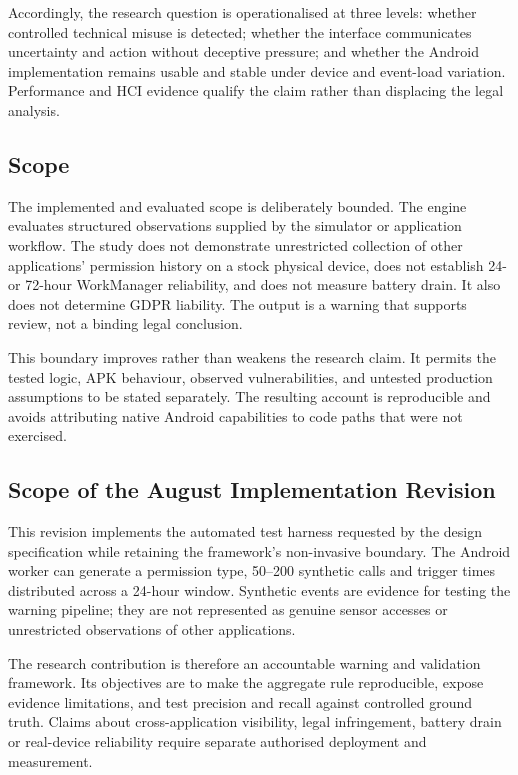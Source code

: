 Accordingly, the research question is operationalised at three levels: whether controlled technical misuse is detected; whether the interface communicates uncertainty and action without deceptive pressure; and whether the Android implementation remains usable and stable under device and event-load variation. Performance and HCI evidence qualify the claim rather than displacing the legal analysis.

\subsection{Scope}

The implemented and evaluated scope is deliberately bounded. The engine evaluates structured observations supplied by the simulator or application workflow. The study does not demonstrate unrestricted collection of other applications' permission history on a stock physical device, does not establish 24- or 72-hour WorkManager reliability, and does not measure battery drain. It also does not determine GDPR liability. The output is a warning that supports review, not a binding legal conclusion.

This boundary improves rather than weakens the research claim. It permits the tested logic, APK behaviour, observed vulnerabilities, and untested production assumptions to be stated separately. The resulting account is reproducible and avoids attributing native Android capabilities to code paths that were not exercised.

\subsection{Scope of the August Implementation Revision}

This revision implements the automated test harness requested by the design specification while retaining the framework's non-invasive boundary. The Android worker can generate a permission type, 50--200 synthetic calls and trigger times distributed across a 24-hour window. Synthetic events are evidence for testing the warning pipeline; they are not represented as genuine sensor accesses or unrestricted observations of other applications.

The research contribution is therefore an accountable warning and validation framework. Its objectives are to make the aggregate rule reproducible, expose evidence limitations, and test precision and recall against controlled ground truth. Claims about cross-application visibility, legal infringement, battery drain or real-device reliability require separate authorised deployment and measurement.

